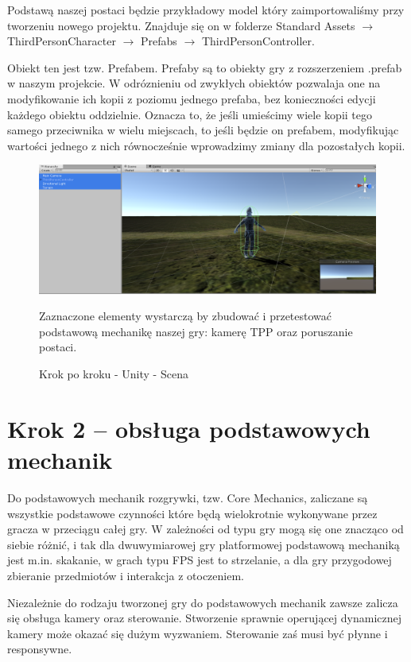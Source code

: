 \documentclass[openright]{xmgr}
\begin{document}
Podstawą naszej postaci będzie przykładowy model który zaimportowaliśmy przy tworzeniu nowego projektu. Znajduje się on w folderze Standard Assets $\rightarrow$ ThirdPersonCharacter $\rightarrow$ Prefabs $\rightarrow$ ThirdPersonController.

Obiekt ten jest tzw. Prefabem. Prefaby są to obiekty gry z rozszerzeniem .prefab w naszym projekcie. W odróznieniu od zwykłych obiektów pozwalaja one na modyfikowanie ich kopii  z poziomu jednego prefaba, bez konieczności edycji każdego obiektu oddzielnie. Oznacza to, że jeśli umieścimy wiele kopii tego samego przeciwnika w wielu miejscach, to jeśli będzie on prefabem, modyfikując wartości jednego z nich równocześnie wprowadzimy zmiany dla pozostałych kopii.

\begin{figure}[!htb]
    \begin{center}
    \includegraphics[scale=0.25]{Screeny/UnityKrokPoKroku/krok1_endscreen.png}
    \end{center}
    \caption{Krok po kroku - Unity - Scena}
Zaznaczone elementy wystarczą by zbudować i przetestować podstawową mechanikę naszej gry: kamerę TPP oraz poruszanie postaci.
\end{figure}

\section{Krok 2 – obsługa podstawowych mechanik}

Do podstawowych mechanik rozgrywki, tzw. Core  Mechanics, zaliczane są wszystkie podstawowe czynności które będą wielokrotnie wykonywane przez gracza w przeciągu całej gry. W zależności od typu gry mogą się one znacząco od siebie różnić, i tak dla dwuwymiarowej gry platformowej podstawową mechaniką jest m.in. skakanie, w grach typu FPS jest to strzelanie, a dla gry przygodowej zbieranie przedmiotów i interakcja z otoczeniem.

Niezależnie do rodzaju tworzonej gry do podstawowych mechanik zawsze zalicza się obsługa kamery oraz sterowanie. Stworzenie sprawnie operującej dynamicznej kamery może okazać się dużym wyzwaniem. Sterowanie zaś musi być płynne i responsywne.
\end{document}
